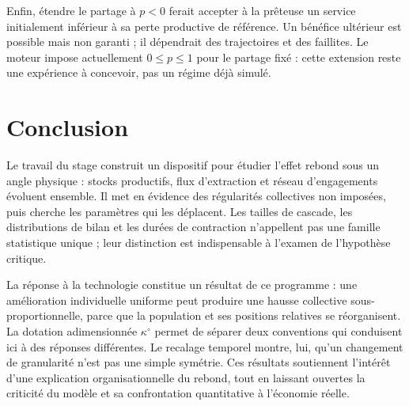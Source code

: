 Enfin, étendre le partage à $p<0$ ferait accepter à la prêteuse un
service initialement inférieur à sa perte productive de référence.
Un bénéfice ultérieur est possible mais non garanti ; il dépendrait des
trajectoires et des faillites. Le moteur impose actuellement
$0\le p\le1$ pour le partage fixé : cette extension reste une expérience
à concevoir, pas un régime déjà simulé.

\section{Conclusion}
Le travail du stage construit un dispositif pour étudier l'effet rebond
sous un angle physique : stocks productifs, flux d'extraction et réseau
d'engagements évoluent ensemble. Il met en évidence des régularités
collectives non imposées, puis cherche les paramètres qui les déplacent.
Les tailles de cascade, les distributions de bilan et les durées de
contraction n'appellent pas une famille statistique unique ; leur
distinction est indispensable à l'examen de l'hypothèse critique.

La réponse à la technologie constitue un résultat de ce programme :
une amélioration individuelle uniforme peut produire une hausse collective
sous-proportionnelle, parce que la population et ses positions relatives
se réorganisent. La dotation adimensionnée $\kappa^\circ$ permet de
séparer deux conventions qui conduisent ici à des réponses différentes.
Le recalage temporel montre, lui, qu'un changement de granularité n'est
pas une simple symétrie. Ces résultats soutiennent l'intérêt d'une
explication organisationnelle du rebond, tout en laissant ouvertes
la criticité du modèle et sa confrontation quantitative à l'économie réelle.

